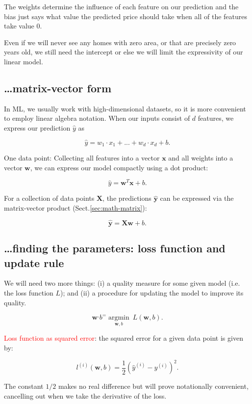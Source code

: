 The weights determine the influence of each feature on our prediction and the
bias just says what value the predicted price should take when all of the
features take value $0$.

Even if we will never see any homes with zero area, or that are precisely zero
years old, we still need the intercept or else we will limit the expressivity of
our linear model.

\subsection{\ldots matrix-vector form}

In ML, we usually work with high-dimensional datasets, so it is more convenient
to employ linear algebra notation. When our inputs consist of $d$ features, we
express our prediction $\hat{y}$ as

$$\hat{y} = w_1 \cdot x_1 + ... + w_d \cdot x_d + b.$$

One data point: Collecting all features into a vector $\mathbf{x}$ and all weights into a vector
$\mathbf{w}$, we can express our model compactly using a dot product:

$$\hat{y} = \mathbf{w}^T \mathbf{x} + b.$$ 

For a collection of data points $\mathbf{X}$, the predictions $\hat{\mathbf{y}}$
can be expressed via the matrix-vector product (Sect.\ref{sec:math-matrix}):

$${\hat{\mathbf{y}}} = \mathbf X \mathbf{w} + b.$$

\subsection{\ldots finding the parameters: loss function and update rule}

We will need two more things: (i) a quality measure for some given model (i.e. the loss function $L$); and
(ii) a procedure for updating the model to improve its quality.

$$\mathbf{w}^, b^ = \operatorname*{argmin}_{\mathbf{w}, b}\ L(\mathbf{w}, b).$$

\textcolor{red}{Loss function as squared error}: the squared error for a given data point is given by:

$$l^{(i)}(\mathbf{w}, b) = \frac{1}{2} \left(\hat{y}^{(i)} - y^{(i)}\right)^2.$$

The constant $1/2$ makes no real difference but will prove notationally convenient, cancelling out when we take the derivative of the loss. 

